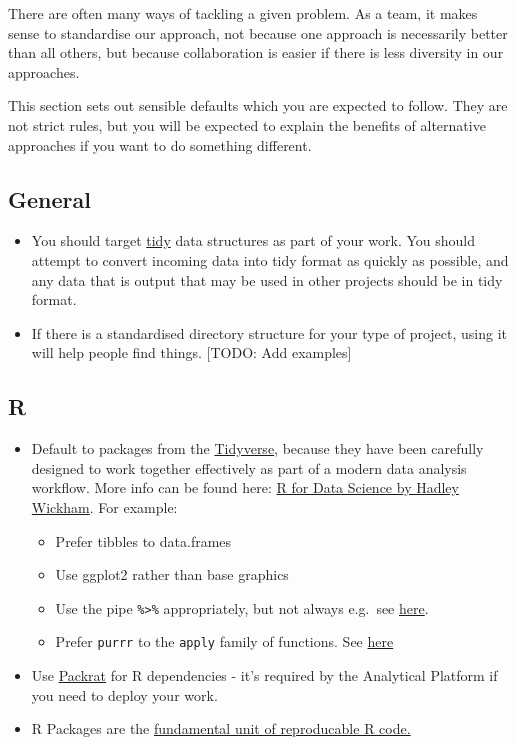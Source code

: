 \documentclass[]{book}
\providecommand{\tightlist}{%
  \setlength{\itemsep}{0pt}\setlength{\parskip}{0pt}}
\begin{document}
There are often many ways of tackling a given problem. As a team, it makes sense to standardise our approach, not because one approach is necessarily better than all others, but because collaboration is easier if there is less diversity in our approaches.

This section sets out sensible defaults which you are expected to follow. They are not strict rules, but you will be expected to explain the benefits of alternative approaches if you want to do something different.

\hypertarget{general}{%
\subsection{General}\label{general}}

\begin{itemize}
\tightlist
\item
  You should target \href{http://vita.had.co.nz/papers/tidy-data.html}{tidy} data structures as part of your work. You should attempt to convert incoming data into tidy format as quickly as possible, and any data that is output that may be used in other projects should be in tidy format.
\item
  If there is a standardised directory structure for your type of project, using it will help people find things. {[}TODO: Add examples{]}
\end{itemize}

\hypertarget{r-1}{%
\subsection{R}\label{r-1}}

\begin{itemize}
\tightlist
\item
  Default to packages from the \href{http://tidyverse.org/}{Tidyverse}, because they have been carefully designed to work together effectively as part of a modern data analysis workflow. More info can be found here: \href{http://r4ds.had.co.nz}{R for Data Science by Hadley Wickham}. For example:

  \begin{itemize}
  \tightlist
  \item
    Prefer tibbles to data.frames
  \item
    Use ggplot2 rather than base graphics
  \item
    Use the pipe \texttt{\%\textgreater{}\%} appropriately, but not always e.g.~see \href{https://twitter.com/hadleywickham/status/603883121197514752}{here}.\\
  \item
    Prefer \texttt{purrr} to the \texttt{apply} family of functions. See \href{http://r4ds.had.co.nz/iteration.html\#the-map-functions}{here}
  \end{itemize}
\item
  Use \href{https://rstudio.github.io/packrat/}{Packrat} for R dependencies - it's required by the Analytical Platform if you need to deploy your work.
\item
  R Packages are the \href{http://r-pkgs.had.co.nz/}{fundamental unit of reproducable R code.}
\end{itemize}
\end{document}
